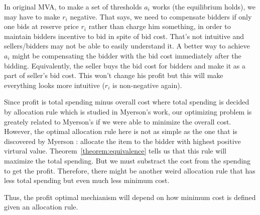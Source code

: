 \begin{proposition}
In original MVA, to make a set of thresholds $a_i$ works (the
equilibrium holds), we may have to make $r_i$ negative. That says, we need to
compensate bidders if only one bids at reserve price $r_i$ rather than charge
him something, in order to maintain bidders incentive to bid in spite of
bid cost. That's not intuitive and sellers/bidders may
not be able to easily understand it. A better way to achieve $a_i$ might be
compensating the bidder with the bid cost immediately after the bidding.
Equivalently, the seller buys the bid cost for bidders and make it as a
part of seller's bid cost. This won't change his profit but this will make
everything looks more intuitive ($r_i$ is non-negative again).
\end{proposition}

Since profit is total spending minus overall cost where total spending is
decided by allocation rule which is studied in Myerson's work, our optimizing
problem is greately related to Myerson's if we were able to minimize the
overall cost. However, the optimal allocation rule here is not as simple as the
one that is discovered by Myerson \cite{Myerson:1981}: allocate the item to the
bidder with highest positive virtural value.  Theorem~\ref{theorem:equivalence}
tells us that this rule will maximize the total spending.  But we must
substract the cost from the spending to get the profit.  Therefore, there might
be another weird allocation rule that has less total spending but even much
less minimum cost.


Thus, the profit optimal mechianism will depend on how minimum cost is defined given an allocation rule. 

